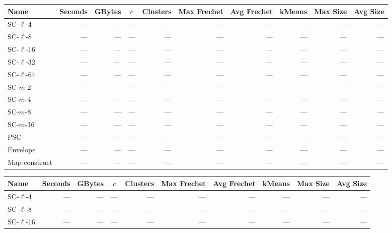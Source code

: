 \begin{figure} \begin{center}
    \begin{minipage}{\textwidth}
    {
    \begin{tabular}{@{}lrrcrrrrrr@{}}
        \toprule
        Name & Seconds & GBytes & $c$ & Clusters & Max Frechet & Avg Frechet & kMeans & Max Size & Avg Size\\
        \midrule
        SC-$\ell$-4 & --- & --- & --- & --- & --- & --- & --- & --- & ---\\
        SC-$\ell$-8 & --- & --- & --- & --- & --- & --- & --- & --- & ---\\
        SC-$\ell$-16 & --- & --- & --- & --- & --- & --- & --- & --- & ---\\
        SC-$\ell$-32 & --- & --- & --- & --- & --- & --- & --- & --- & ---\\
        SC-$\ell$-64 & --- & --- & --- & --- & --- & --- & --- & --- & ---\\
        SC-$m$-2 & --- & --- & --- & --- & --- & --- & --- & --- & ---\\
        SC-$m$-4 & --- & --- & --- & --- & --- & --- & --- & --- & ---\\
        SC-$m$-8 & --- & --- & --- & --- & --- & --- & --- & --- & ---\\
        SC-$m$-16 & --- & --- & --- & --- & --- & --- & --- & --- & ---\\
        PSC & --- & --- & --- & --- & --- & --- & --- & --- & ---\\
        Envelope & --- & --- & --- & --- & --- & --- & --- & --- & ---\\
        Map-construct & --- & --- & --- & --- & --- & --- & --- & --- & ---\\
        \bottomrule
    \end{tabular}
    }
    {
    \begin{tabular}{@{}lrrcrrrrrr@{}}
        \toprule
        Name & Seconds & GBytes & $c$ & Clusters & Max Frechet & Avg Frechet & kMeans & Max Size & Avg Size\\
        \midrule
        SC-$\ell$-4 & --- & --- & --- & --- & --- & --- & --- & --- & ---\\
        SC-$\ell$-8 & --- & --- & --- & --- & --- & --- & --- & --- & ---\\
        SC-$\ell$-16 & --- & --- & --- & --- & --- & --- & --- & --- & ---\\

\end{tabular}}
\end{minipage}
\end{center}
\end{figure}
